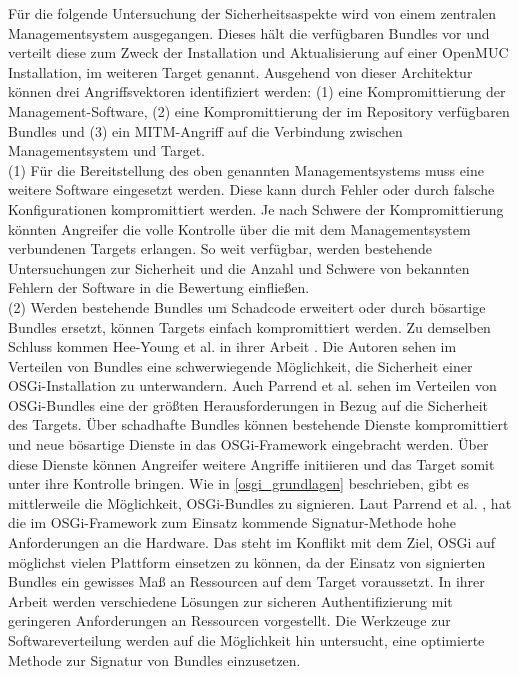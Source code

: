 Für die folgende Untersuchung der Sicherheitsaspekte wird von einem zentralen Managementsystem ausgegangen. Dieses hält die verfügbaren Bundles vor und 
verteilt diese zum Zweck der Installation und Aktualisierung auf einer OpenMUC Installation, im weiteren Target genannt.
Ausgehend von dieser Architektur können drei Angriffsvektoren identifiziert werden: (1) eine Kompromittierung der Management-Software,
(2) eine Kompromittierung der im Repository verfügbaren Bundles und (3) ein \ac{MITM}-Angriff auf die Verbindung
zwischen Managementsystem und Target.\\

(1) Für die Bereitstellung des oben genannten Managementsystems muss eine weitere Software eingesetzt werden.
Diese kann durch Fehler oder durch falsche Konfigurationen kompromittiert werden.
Je nach Schwere der Kompromittierung könnten Angreifer die volle Kontrolle über die mit dem Managementsystem verbundenen Targets erlangen. 
So weit verfügbar, werden bestehende Untersuchungen zur Sicherheit und die Anzahl und Schwere von bekannten Fehlern der Software in die Bewertung einfließen.\\

(2) Werden bestehende Bundles um Schadcode erweitert oder durch bösartige Bundles ersetzt, können Targets einfach kompromittiert werden.
Zu demselben Schluss kommen Hee-Young et al. in ihrer Arbeit \cite{bundle_auth}. Die Autoren sehen im Verteilen von Bundles 
eine schwerwiegende Möglichkeit, die Sicherheit einer \ac{OSGi}-Installation zu unterwandern.
Auch Parrend et al. \cite{sfelix} sehen im Verteilen von \ac{OSGi}-Bundles eine der größten Herausforderungen in Bezug auf die Sicherheit des Targets.
Über schadhafte Bundles können bestehende Dienste kompromittiert und neue bösartige Dienste in das 
\ac{OSGi}-Framework eingebracht werden. Über diese Dienste können Angreifer weitere Angriffe initiieren und das Target somit unter ihre Kontrolle bringen. 
Wie in \autoref{osgi_grundlagen} beschrieben, gibt es mittlerweile die Möglichkeit, \ac{OSGi}-Bundles zu signieren.
Laut Parrend et al. \cite{sfelix}, hat die im \ac{OSGi}-Framework zum Einsatz kommende Signatur-Methode hohe Anforderungen an die Hardware.
Das steht im Konflikt mit dem Ziel, \ac{OSGi} auf möglichst vielen Plattform einsetzen zu können, da der Einsatz von signierten Bundles ein gewisses Maß an Ressourcen
auf dem Target voraussetzt.
In ihrer Arbeit \cite{sfelix} werden verschiedene Lösungen zur sicheren Authentifizierung mit geringeren Anforderungen an Ressourcen vorgestellt. 
Die Werkzeuge zur Softwareverteilung werden auf die Möglichkeit hin untersucht, eine optimierte Methode zur Signatur von Bundles einzusetzen.\\

